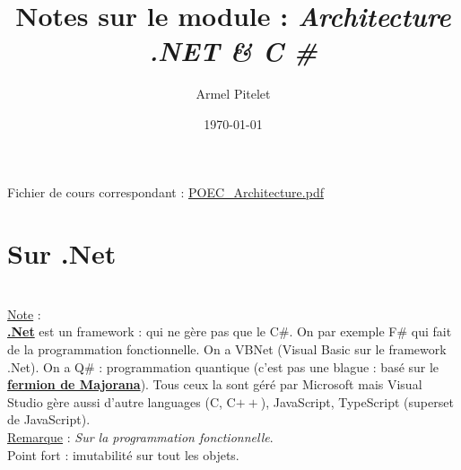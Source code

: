 \documentclass[a4paper,12pt,twoside]{article}
\title{Notes sur le module : \textit{Architecture .NET \& C \#}}
\author{Armel Pitelet}
\date{\today}
\newcommand{\exemplepath}{../Exercices}
\newcommand{\urlcolor}{magenta}  %
\newcommand{\pdfcolor}{red} %
\newcommand{\foldercolor}{orange} %
\newcommand{\cscolor}{green!60!black} %
\newcommand{\slncolor}{violet} %
\newcommand{\keycolor}{purple} %
\newcommand{\rem}[2]{\noindent\underline{Remarque} : \textit{#1}.\\ \indent #2}
\newcommand{\note}[1]{\noindent\underline{Note} : \\ \indent #1}
\newcommand{\pdfref}[2]{\hypersetup{urlcolor=\pdfcolor}\href{file: #1.pdf}{#2.pdf}\hypersetup{urlcolor=\urlcolor}}
\newcommand{\csref}[2]{\hypersetup{urlcolor=\cscolor}\href{file:\exemplepath /#1.cs}{#2.cs}\hypersetup{urlcolor=\urlcolor}}
\newcommand{\slnref}[2]{\hypersetup{urlcolor=\slncolor}\href{file:\exemplepath /#1.sln}{#2.sln}\hypersetup{urlcolor=\urlcolor}}
\newcommand{\folderref}[2]{\hypersetup{urlcolor=\foldercolor}\href{file:\exemplepath /#1/.}{#2}\hypersetup{urlcolor=\urlcolor}}
\newcommand{\keyref}[2]{\hypersetup{urlcolor=\keycolor} \href{#1}{\textbf{#2}}\hypersetup{urlcolor=\urlcolor}}
\begin{document}
\maketitle
\tableofcontents
\newpage

Fichier de cours correspondant : %
\href{run:../Cours/POEC\_Architecture.pdf}{POEC\_Architecture.pdf} %
\section{Sur .Net}

\\

\note{\keyref{https://fr.wikipedia.org/wiki/Microsoft\_.NET}{.Net} est un framework : qui ne gère pas que le C\#. On par exemple F\# qui fait de la programmation fonctionnelle. On a VBNet (Visual Basic sur le framework .Net). On a Q\# : programmation quantique (c'est pas une blague : basé sur le \keyref{https://fr.wikipedia.org/wiki/Particule_de_Majorana}{fermion de Majorana}). Tous ceux la sont géré par Microsoft mais Visual Studio gère aussi d'autre languages (C, C$++$), JavaScript, TypeScript (superset de JavaScript).}\\

\rem{Sur la programmation fonctionnelle}{Point fort : imutabilité sur tout les objets.}\\
\end{document}
